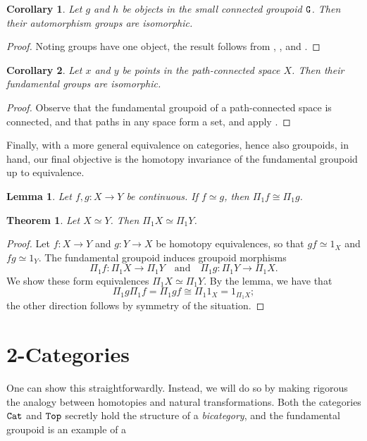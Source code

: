 \documentclass[11 pt]{amsart}
\theoremstyle{plain}   %
\newtheorem{thm}{Theorem}[section] %
\newtheorem{cor}{Corollary}[section]
\newtheorem{lemma}{Lemma}[section]
\theoremstyle{definition}
\theoremstyle{remark}
\numberwithin{equation}{section}
\newcommand{\cat}[1]{{\normalfont\texttt{#1}}}
\begin{document}
\begin{cor}\label{connected groups are isomorphic}
	Let $g$ and $h$ be objects in the small connected groupoid $\cat{G}$. Then their
	automorphism groups are isomorphic.
\end{cor}

\begin{proof}
	Noting groups have one object, the result follows from , , and .
\end{proof}

\begin{cor}
	Let $x$ and $y$ be points in the path-connected space $X$. Then their
	fundamental groups are isomorphic.
\end{cor}

\begin{proof}
	Observe that the fundamental groupoid of a path-connected space is connected,
	and that paths in any space form a set, and apply .
\end{proof}

Finally, with a more general equivalence on categories, hence also groupoids, in
hand, our final objective is the homotopy invariance of the fundamental
groupoid up to equivalence.

\begin{lemma}
	Let $f,g: X\rightarrow Y$ be continuous. If $f\simeq g$, then
	$\Pi_1f\cong\Pi_1g$.
\end{lemma}

\begin{thm}
	Let $X\simeq Y$. Then $\Pi_1X\simeq \Pi_1Y$.
\end{thm}

\begin{proof}
	Let $f: X\rightarrow Y$ and $g: Y\rightarrow X$ be homotopy equivalences, so
	that $gf\simeq 1_X$ and $fg\simeq 1_Y$. The fundamental groupoid induces
	groupoid morphisms $$\Pi_1f: \Pi_1X\rightarrow\Pi_1Y\quad\text{and}\quad\Pi_1g:
		\Pi_1Y\rightarrow\Pi_1X.$$
	We show these form equivalences $\Pi_1X\simeq \Pi_1Y$. By the lemma, we have
	that $$\Pi_1g\Pi_1f = \Pi_1 gf\cong \Pi_1{1_X} = 1_{\Pi_1 X};$$ the other
	direction follows by symmetry of the situation.
\end{proof}


\section{2-Categories}

One can show this straightforwardly. Instead, we will do so by making rigorous
the analogy between homotopies and natural transformations. Both the categories
$\cat{Cat}$ and $\cat{Top}$ secretly hold the structure of a \emph{bicategory},
and the fundamental groupoid is an example of a



\end{document}
